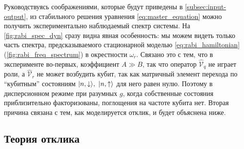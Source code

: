 \documentclass[12pt, twoside]{report}
\DeclarePairedDelimiter\ket{\lvert}{\rangle}
\numberwithin{equation}{section}
\numberwithin{figure}{section}
\begin{document}
Руководствуясь соображениями, которые будут приведены в \autoref{subsec:input-output}, из стабильного решения уравнения \eqref{eq:master_equation} можно получить экспериментально наблюдаемый спектр системы. На \autoref{fig:rabi_spec_dyn} сразу видна явная особенность: мы можем видеть только часть спектра, предсказываемого стационарной моделью \eqref{eq:rabi_hamiltonian} (\autoref{fig:rabi_freq_spectrum})  в окрестности $\omega_r$. Связано это с тем, что в эксперименте во-первых, коэффициент $A\gg B$, так что оператор $\mathcal{\hat V}_q$ не играет роли, а $\mathcal{\hat V}_r$ не может возбудить кубит, так как матричный элемент перехода по ``кубитным'' состояниям $\ket{n, \downarrow},\ \ket{n, \uparrow}$ для него равен нулю. Поэтому в дисперсионном режиме при разумных $g$, когда собственные состояния приблизительно факторизованы, поглощения на частоте кубита нет\cite{Blais2004}. Вторая причина связана с тем, как моделируется отклик, и будет объяснена ниже.

\subsection{Теория отклика} \label{subsec:input-output}
\end{document}

